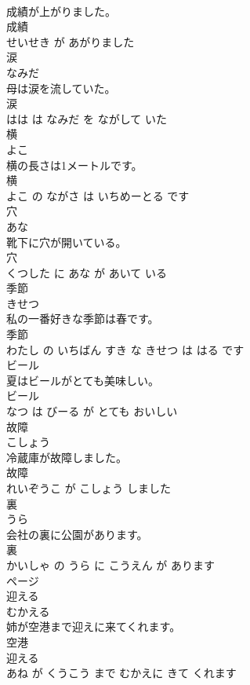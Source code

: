 \documentclass[8pt]{extreport}
\begin{document}
\begin{CJK}{UTF8}{min}
\\	成績が上がりました。	
\\	成績 
\\	せいせき が あがりました			
\\	涙	
\\	なみだ			
\\	母は涙を流していた。	
\\	涙 
\\	はは は なみだ を ながして いた			
\\	横	
\\	よこ			
\\	横の長さは1メートルです。	
\\	横 
\\	よこ の ながさ は いちめーとる です			
\\	穴	
\\	あな			
\\	靴下に穴が開いている。	
\\	穴 
\\	くつした に あな が あいて いる			
\\	季節	
\\	きせつ			
\\	私の一番好きな季節は春です。	
\\	季節 
\\	わたし の いちばん すき な きせつ は はる です			
\\	ビール	
\\	夏はビールがとても美味しい。	
\\	ビール 
\\	なつ は びーる が とても おいしい			
\\	故障	
\\	こしょう			
\\	冷蔵庫が故障しました。	
\\	故障 
\\	れいぞうこ が こしょう しました			
\\	裏	
\\	うら			
\\	会社の裏に公園があります。	
\\	裏 
\\	かいしゃ の うら に こうえん が あります			
\\	ページ	
\\	迎える	
\\	むかえる			
\\	姉が空港まで迎えに来てくれます。	
\\	空港 
\\	迎える 
\\	あね が くうこう まで むかえに きて くれます			

\end{CJK}
\end{document}
